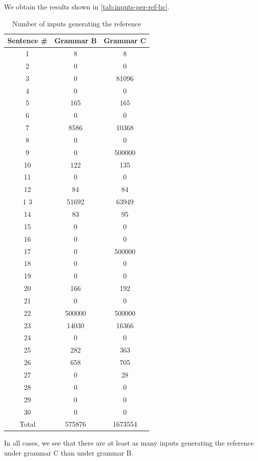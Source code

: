 \documentclass[a4paper,oneside,reqno]{amsart}
\begin{document}
\begin{enumerate}[label=\arabic*.]
    We obtain the results shown in \autoref{tab:inputs-per-ref-bc}.
    \begin{table}[h]
      \begin{tabular}{ccc}
        \toprule
        Sentence \# & Grammar B & Grammar C \\
        \midrule
        1 & 8 & 8 \\
        2 & 0 & 0 \\
        3 & 0 & 81096 \\
        4 & 0 & 0 \\
        5 & 165 & 165 \\
        6 & 0 & 0 \\
        7 & 8586 & 10368 \\
        8 & 0 & 0 \\
        9 & 0 & 500000 \\
        10 & 122 & 135 \\
        11 & 0 & 0 \\
        12 & 84 & 84 \\
        1 3 & 51692 & 63949 \\
        14 & 83 & 95 \\
        15 & 0 & 0 \\
        16 & 0 & 0 \\
        17 & 0 & 500000 \\
        18 & 0 & 0 \\
        19 & 0 & 0 \\
        20 & 166 & 192 \\
        21 & 0 & 0 \\
        22 & 500000 & 500000 \\
        23 & 14030 & 16366 \\
        24 & 0 & 0 \\
        25 & 282 & 363 \\
        26 & 658 & 705 \\
        27 & 0 & 28 \\
        28 & 0 & 0 \\
        29 & 0 & 0 \\
        30 & 0 & 0 \\
        Total & 575876 & 1673554 \\
        \bottomrule
      \end{tabular}
      \caption{Number of inputs generating the reference}
      \label{tab:inputs-per-ref-bc}
    \end{table}
    In all cases, we see that there are at least as many inputs
    generating the reference under grammar C than under grammar B.


\end{enumerate}
\end{document}
